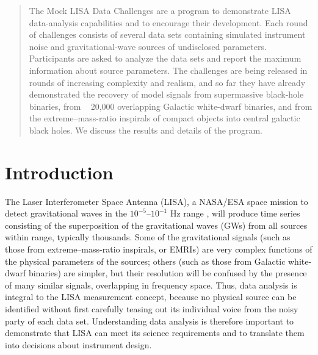 \documentclass{iopart}
\begin{document}

\begin{abstract}
The Mock LISA Data Challenges are a program to demonstrate LISA data-analysis capabilities and to encourage their development. Each round of challenges consists of several data sets containing simulated instrument noise and gravitational-wave sources of undisclosed parameters. Participants are asked to analyze the data sets and report the maximum information about source parameters. The  
challenges are being released in rounds of increasing complexity and realism, and so far they have already demonstrated the recovery of model signals from supermassive black-hole binaries, from ~ 20,000 overlapping Galactic white-dwarf binaries, and from the extreme--mass-ratio inspirals of compact objects into central galactic black holes. We discuss the results and details of the program.
\end{abstract}

\vspace{-12pt}


\section{Introduction}

The Laser Interferometer Space Antenna (LISA), a NASA/ESA space mission to detect gravitational waves in the $10^{-5}$--$10^{-1}$ Hz range \cite{lisa}, will produce time series consisting of the superposition of the gravitational waves (GWs) from all sources within range, typically thousands. Some of the gravitational signals (such as those from extreme--mass-ratio inspirals, or EMRIs) are very complex functions of the physical parameters of the sources; others (such as those from Galactic white-dwarf binaries) are simpler, but their resolution will be confused by the presence of many similar signals, overlapping in frequency space. Thus, data analysis is integral to the LISA measurement concept, because no physical source can be identified without first carefully teasing out its individual voice from the noisy party of each data set. Understanding data analysis is therefore important to demonstrate that LISA can meet its science requirements and to translate them into decisions about instrument design.
\end{document}
